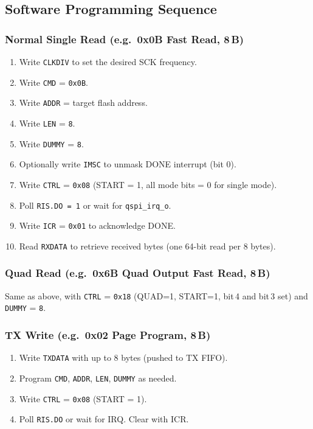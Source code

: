 \subsection{Software Programming Sequence}

\subsubsection{Normal Single Read (e.g.\ 0x0B Fast Read, 8\,B)}

\begin{enumerate}
  \item Write \texttt{CLKDIV} to set the desired SCK frequency.
  \item Write \texttt{CMD} = \texttt{0x0B}.
  \item Write \texttt{ADDR} = target flash address.
  \item Write \texttt{LEN} = \texttt{8}.
  \item Write \texttt{DUMMY} = \texttt{8}.
  \item Optionally write \texttt{IMSC} to unmask DONE interrupt (bit 0).
  \item Write \texttt{CTRL} = \texttt{0x08} (START = 1, all mode bits = 0 for single mode).
  \item Poll \texttt{RIS.DO = 1} or wait for \texttt{qspi\_irq\_o}.
  \item Write \texttt{ICR} = \texttt{0x01} to acknowledge DONE.
  \item Read \texttt{RXDATA} to retrieve received bytes (one 64-bit read per 8 bytes).
\end{enumerate}

\subsubsection{Quad Read (e.g.\ 0x6B Quad Output Fast Read, 8\,B)}

Same as above, with \texttt{CTRL} = \texttt{0x18} (QUAD=1, START=1, bit\,4 and bit\,3 set)
and \texttt{DUMMY} = \texttt{8}.

\subsubsection{TX Write (e.g.\ 0x02 Page Program, 8\,B)}

\begin{enumerate}
  \item Write \texttt{TXDATA} with up to 8 bytes (pushed to TX FIFO).
  \item Program \texttt{CMD}, \texttt{ADDR}, \texttt{LEN}, \texttt{DUMMY} as needed.
  \item Write \texttt{CTRL} = \texttt{0x08} (START = 1).
  \item Poll \texttt{RIS.DO} or wait for IRQ. Clear with ICR.
\end{enumerate}

